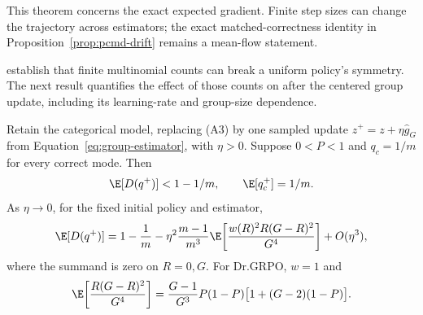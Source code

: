 This theorem concerns the exact expected gradient. Finite step sizes can
change the trajectory across estimators; the exact matched-correctness
identity in Proposition~\ref{prop:pcmd-drift} remains a mean-flow statement.

\citet[Proposition~A.1]{lochab2026ucpo} establish that finite multinomial
counts can break a uniform policy's symmetry. The next result quantifies
the effect of those counts on \pmd{} after the centered group update,
including its learning-rate and group-size dependence.

\begin{proposition}
\enforcehalffinalproseline
\label{prop:stochastic-pcmd}
Retain the categorical model, replacing (A3) by one sampled update
$z^+=z+\eta\widehat g_G$ from Equation~\eqref{eq:group-estimator}, with
$\eta>0$. Suppose $0<P<1$ and $q_c=1/m$ for every correct mode. Then
\begin{equation}
 \E[D(q^+)]<1-1/m,
 \qquad \E[q_c^+]=1/m.
 \label{eq:stochastic-strict-decrease}
\end{equation}
As $\eta\to0$, for the fixed initial policy and estimator,
\begin{equation}
 \E[D(q^+)]
 =1-\frac1m
  -\eta^2\frac{m-1}{m^3}
    \E\!\left[\frac{w(R)^2R(G-R)^2}{G^4}\right]
  +O(\eta^3),
 \label{eq:stochastic-pcmd-expansion}
\end{equation}
where the summand is zero on $R=0,G$. For Dr.GRPO, $w=1$ and
\begin{equation}
 \E\!\left[\frac{R(G-R)^2}{G^4}\right]
 =\frac{G-1}{G^3}P(1-P)\big[1+(G-2)(1-P)\big].
 \label{eq:stochastic-dr-coefficient}
\end{equation}
\end{proposition}

